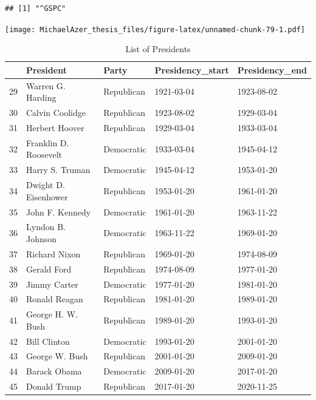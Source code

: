 \documentclass[]{book}
\begin{document}
\begin{verbatim}
## [1] "^GSPC"
\end{verbatim}

\texttt{[image: MichaelAzer\_thesis\_files/figure-latex/unnamed-chunk-79-1.pdf]}

\begin{table}

\caption{\label{tab:unnamed-chunk-82}List of Presidents}
\centering
\begin{tabular}[t]{l|l|l|l|l}
\hline
  & President & Party & Presidency\_start & Presidency\_end\\
\hline
29 & Warren G. Harding & Republican & 1921-03-04 & 1923-08-02\\
\hline
30 & Calvin Coolidge & Republican & 1923-08-02 & 1929-03-04\\
\hline
31 & Herbert Hoover & Republican & 1929-03-04 & 1933-03-04\\
\hline
32 & Franklin D. Roosevelt & Democratic & 1933-03-04 & 1945-04-12\\
\hline
33 & Harry S. Truman & Democratic & 1945-04-12 & 1953-01-20\\
\hline
34 & Dwight D. Eisenhower & Republican & 1953-01-20 & 1961-01-20\\
\hline
35 & John F. Kennedy & Democratic & 1961-01-20 & 1963-11-22\\
\hline
36 & Lyndon B. Johnson & Democratic & 1963-11-22 & 1969-01-20\\
\hline
37 & Richard Nixon & Republican & 1969-01-20 & 1974-08-09\\
\hline
38 & Gerald Ford & Republican & 1974-08-09 & 1977-01-20\\
\hline
39 & Jimmy Carter & Democratic & 1977-01-20 & 1981-01-20\\
\hline
40 & Ronald Reagan & Republican & 1981-01-20 & 1989-01-20\\
\hline
41 & George H. W. Bush & Republican & 1989-01-20 & 1993-01-20\\
\hline
42 & Bill Clinton & Democratic & 1993-01-20 & 2001-01-20\\
\hline
43 & George W. Bush & Republican & 2001-01-20 & 2009-01-20\\
\hline
44 & Barack Obama & Democratic & 2009-01-20 & 2017-01-20\\
\hline
45 & Donald Trump & Republican & 2017-01-20 & 2020-11-25\\
\hline
\end{tabular}
\end{table}
\end{document}
